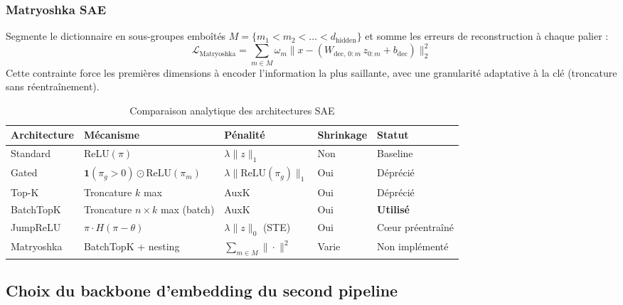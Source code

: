 \documentclass[11pt]{article}
\newcommand{\ind}{\mathbf{1}}
\begin{document}
\subsubsection{Matryoshka SAE}
Segmente le dictionnaire en sous-groupes emboîtés
$M = \{m_1 < m_2 < \dots < d_\text{hidden}\}$ et somme les erreurs de
reconstruction à chaque palier \cite{bussmann2025matryoshka} :
\[
  \mathcal{L}_\text{Matryoshka} = \sum_{m \in M} \omega_m \bigl\|x - (W_{\text{dec},\,0:m}\,z_{0:m} + b_\text{dec})\bigr\|_2^2
\]
Cette contrainte force les premières dimensions à encoder l'information la
plus saillante, avec une granularité adaptative à la clé (troncature sans
réentraînement).

\begin{table}[h!]
\centering
\caption{Comparaison analytique des architectures SAE}
\label{tab:sae-archs}
\vspace{0.5em}\small
\begin{tabular}{@{}lllll@{}}
\toprule
\textbf{Architecture} & \textbf{Mécanisme} & \textbf{Pénalité}
  & \textbf{Shrinkage} & \textbf{Statut} \\ \midrule
Standard  & $\text{ReLU}(\pi)$                          & $\lambda\|z\|_1$          & Non  & Baseline \\
Gated     & $\ind(\pi_g>0) \odot \text{ReLU}(\pi_m)$   & $\lambda\|\text{ReLU}(\pi_g)\|_1$ & Oui & Déprécié\\
Top-K     & Troncature $k$ max                          & AuxK                      & Oui  & Déprécié \\
BatchTopK & Troncature $n{\times}k$ max (batch)         & AuxK                      & Oui  & \textbf{Utilisé} \\
JumpReLU  & $\pi \cdot H(\pi - \theta)$                 & $\lambda\|z\|_0$ (STE)    & Oui  & Cœur préentraîné \\
Matryoshka & BatchTopK + nesting                        & $\sum_{m\in M}\|\cdot\|^2$ & Varie & Non implémenté \\ \bottomrule
\end{tabular}
\end{table}

\subsection{Choix du backbone d'embedding du second pipeline}
\end{document}
